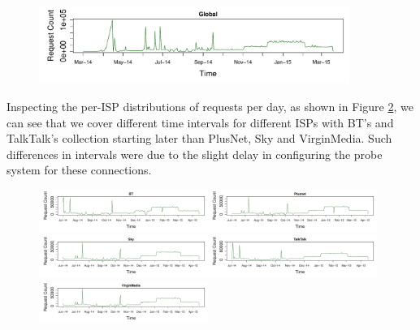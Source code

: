 \documentclass{bmcart}
\begin{document}
\begin{figure}[h!]
\caption{}
\includegraphics[width=0.9\textwidth]{imgs/ts-global-requests.pdf}
\label{fig:total-requests}
\end{figure}

Inspecting the per-ISP distributions of requests per day, as shown in Figure \ref{fig:broadband-requests}, we can see that we cover different time intervals for different ISPs with BT's and TalkTalk's collection starting later than PlusNet, Sky and VirginMedia.
Such differences in intervals were due to the slight delay in configuring the probe system for these connections. 

\begin{figure}[h!]
\caption{}
\includegraphics[width=0.49\textwidth]{imgs/BT-ts-requests.pdf}\includegraphics[width=0.49\textwidth]{imgs/Plusnet-ts-requests.pdf}
\includegraphics[width=0.49\textwidth]{imgs/Sky-ts-requests.pdf}\includegraphics[width=0.49\textwidth]{imgs/TalkTalk-ts-requests.pdf}
\includegraphics[width=0.49\textwidth]{imgs/VirginMedia-ts-requests.pdf}
\label{fig:broadband-requests}
\end{figure}
\end{document}
